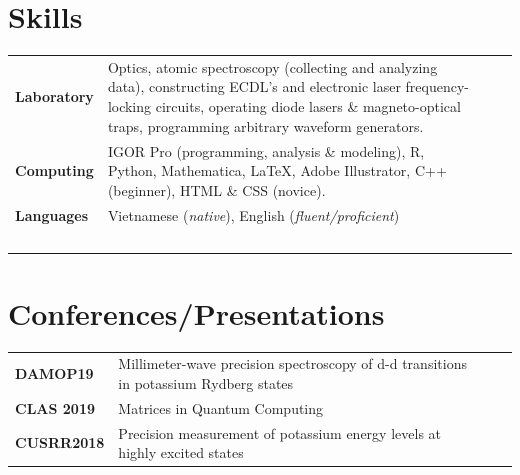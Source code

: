 \documentclass[a4paper, 10.5pt]{article}
\begin{document}
	\section*{\normalsize{{\color{colby}Skills}}}
		\begin{tabular}{lp{13.5cm}lp{8in}}
			
			\textbf{Laboratory} & Optics, atomic spectroscopy (collecting and analyzing data), constructing ECDL's and electronic laser frequency-locking circuits, operating diode lasers \& magneto-optical traps, programming arbitrary waveform generators.\\
			
			\textbf{Computing} & IGOR Pro (programming, analysis \& modeling), R, Python, Mathematica, \LaTeX{}, Adobe Illustrator, C++ (beginner), HTML \& CSS (novice).\\
			
			
			\textbf{Languages} & Vietnamese (\textit{native}), English (\textit{fluent/proficient})\\
			$\,$
		\end{tabular}
	
	\section*{\normalsize{{\color{colby}Conferences/Presentations}}}
		\begin{tabular}{lp{13.5cm}lp{8in}}
			\textbf{DAMOP19} & Millimeter-wave precision spectroscopy of d-d transitions in potassium Rydberg states \\
			\textbf{CLAS 2019} & Matrices in Quantum Computing\\
			\textbf{CUSRR2018} & Precision measurement of potassium energy levels at highly excited states\\
		\end{tabular}
	
\end{document}
